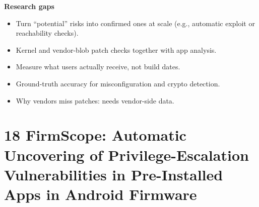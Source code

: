 \documentclass[11pt,a4paper]{article}
\begin{document}
\begin{enumerate}
    \vspace{4pt}
    \textbf{Research gaps}
    \begin{itemize}
        \item Turn ``potential'' risks into confirmed ones at scale (e.g., automatic exploit or reachability checks).
        \item Kernel and vendor-blob patch checks together with app analysis.
        \item Measure what users actually receive, not build dates.
        \item Ground-truth accuracy for misconfiguration and crypto detection.
        \item Why vendors miss patches: needs vendor-side data.
    \end{itemize}

\end{enumerate}

\newpage

\section{18 FirmScope: Automatic Uncovering of Privilege-Escalation Vulnerabilities in Pre-Installed Apps in Android Firmware}
\end{document}
